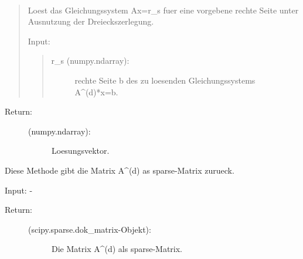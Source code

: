 \documentclass[letterpaper,10pt,ngerman]{sphinxmanual}
\begin{document}
\begin{fulllineitems}
\begin{fulllineitems}
\begin{description}
\begin{description}
\end{description}

\end{description}

\end{fulllineitems}


\begin{fulllineitems}
\label{\detokenize{index:sparse_erw.Sparse.lgs_lsg}}~\begin{quote}

Loest das Gleichungssystem Ax=r\_s fuer eine vorgebene rechte Seite unter Ausnutzung der
Dreieckszerlegung.

Input:
\begin{quote}
\begin{description}
\item[{r\_s (numpy.ndarray):}] \leavevmode
rechte Seite b des zu loesenden Gleichungssystems A\textasciicircum{}(d)*x=b.

\end{description}
\end{quote}
\end{quote}
\begin{description}
\item[{Return:}] \leavevmode\begin{description}
\item[{(numpy.ndarray):}] \leavevmode
Loesungsvektor.

\end{description}

\end{description}

\end{fulllineitems}


\begin{fulllineitems}
\label{\detokenize{index:sparse_erw.Sparse.return_mat_d}}
Diese Methode gibt die Matrix A\textasciicircum{}(d) as sparse-Matrix zurueck.

Input: -
\begin{description}
\item[{Return:}] \leavevmode\begin{description}
\item[{(scipy.sparse.dok\_matrix-Objekt):}] \leavevmode
Die Matrix A\textasciicircum{}(d) als sparse-Matrix.


\end{description}
\end{description}
\end{fulllineitems}
\end{fulllineitems}
\end{document}

